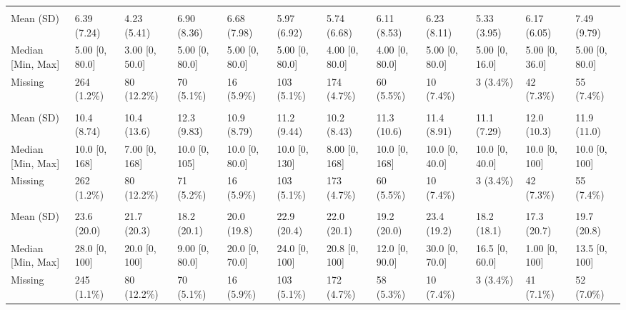 \documentclass[
  single column]{article}
\begin{document}
\begin{landscape}
\begin{longtable}[t]{llllllllllll}
\addlinespace[0.3em]
\multicolumn{12}{l}{\textbf{Hours Exercising per Week}}\\
\hspace{1em}Mean (SD) & 6.39 (7.24) & 4.23 (5.41) & 6.90 (8.36) & 6.68 (7.98) & 5.97 (6.92) & 5.74 (6.68) & 6.11 (8.53) & 6.23 (8.11) & 5.33 (3.95) & 6.17 (6.05) & 7.49 (9.79)\\
\hspace{1em}Median [Min, Max] & 5.00 [0, 80.0] & 3.00 [0, 50.0] & 5.00 [0, 80.0] & 5.00 [0, 80.0] & 5.00 [0, 80.0] & 4.00 [0, 80.0] & 4.00 [0, 80.0] & 5.00 [0, 80.0] & 5.00 [0, 16.0] & 5.00 [0, 36.0] & 5.00 [0, 80.0]\\
\hspace{1em}Missing & 264 (1.2\%) & 80 (12.2\%) & 70 (5.1\%) & 16 (5.9\%) & 103 (5.1\%) & 174 (4.7\%) & 60 (5.5\%) & 10 (7.4\%) & 3 (3.4\%) & 42 (7.3\%) & 55 (7.4\%)\\
\addlinespace[0.3em]
\multicolumn{12}{l}{\textbf{Hours of Housework per Week}}\\
\hspace{1em}Mean (SD) & 10.4 (8.74) & 10.4 (13.6) & 12.3 (9.83) & 10.9 (8.79) & 11.2 (9.44) & 10.2 (8.43) & 11.3 (10.6) & 11.4 (8.91) & 11.1 (7.29) & 12.0 (10.3) & 11.9 (11.0)\\
\hspace{1em}Median [Min, Max] & 10.0 [0, 168] & 7.00 [0, 168] & 10.0 [0, 105] & 10.0 [0, 80.0] & 10.0 [0, 130] & 8.00 [0, 168] & 10.0 [0, 168] & 10.0 [0, 40.0] & 10.0 [0, 40.0] & 10.0 [0, 100] & 10.0 [0, 100]\\
\hspace{1em}Missing & 262 (1.2\%) & 80 (12.2\%) & 71 (5.2\%) & 16 (5.9\%) & 103 (5.1\%) & 173 (4.7\%) & 60 (5.5\%) & 10 (7.4\%) & 3 (3.4\%) & 42 (7.3\%) & 55 (7.4\%)\\
\addlinespace[0.3em]
\multicolumn{12}{l}{\textbf{Hours Working per Week}}\\
\hspace{1em}Mean (SD) & 23.6 (20.0) & 21.7 (20.3) & 18.2 (20.1) & 20.0 (19.8) & 22.9 (20.4) & 22.0 (20.1) & 19.2 (20.0) & 23.4 (19.2) & 18.2 (18.1) & 17.3 (20.7) & 19.7 (20.8)\\
\hspace{1em}Median [Min, Max] & 28.0 [0, 100] & 20.0 [0, 100] & 9.00 [0, 80.0] & 20.0 [0, 70.0] & 24.0 [0, 100] & 20.8 [0, 100] & 12.0 [0, 90.0] & 30.0 [0, 70.0] & 16.5 [0, 60.0] & 1.00 [0, 100] & 13.5 [0, 100]\\
\hspace{1em}Missing & 245 (1.1\%) & 80 (12.2\%) & 70 (5.1\%) & 16 (5.9\%) & 103 (5.1\%) & 172 (4.7\%) & 58 (5.3\%) & 10 (7.4\%) & 3 (3.4\%) & 41 (7.1\%) & 52 (7.0\%)\\

\end{longtable}
\end{landscape}
\end{document}
